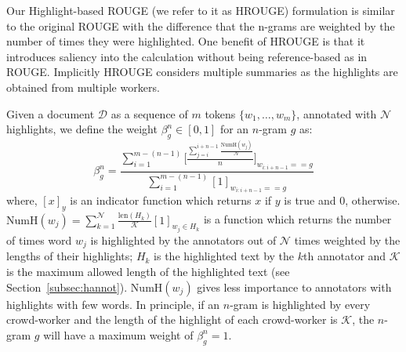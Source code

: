\documentclass[11pt,a4paper]{article}
\newcommand\hrouge{\textsc{HROUGE}}
\newcommand\rouge{\textsc{ROUGE}}
\begin{document}

Our Highlight-based \rouge{} (we refer to it as \hrouge{}) formulation is similar to the original ROUGE with the difference that the n-grams are weighted by the number of times they were highlighted. One benefit of \hrouge{} is that it introduces saliency into the calculation without being reference-based as in \rouge{}. Implicitly \hrouge{} considers multiple summaries as the highlights are obtained from multiple workers. 

Given a document $\mathcal{D}$ as a sequence of $m$ tokens $\{w_1, \ldots, w_m\}$, annotated with $\mathcal{N}$ highlights, we define the weight $\beta_g^n \in [0,1]$ for an $n$-gram $g$ as: 
\begin{equation}
    \beta_g^n = \frac{\displaystyle\sum_{i=1}^{m-(n-1)} \Bigg[\frac{\sum_{j=i}^{i+n-1} \frac{\mathrm{NumH}(w_j)}{\mathcal{N}}}{n}\Bigg]_{w_{i:i+n-1} == g}}{\displaystyle\sum_{i=1}^{m-(n-1)} [1]_{w_{i:i+n-1} == g} }
\end{equation}
\noindent where, $[x]_y$ is an indicator function which returns $x$ if $y$ is true and $0$, otherwise.  $\mathrm{NumH}(w_j) = \sum_{k=1}^{\mathcal{N}} \frac{\mathrm{len}(H_k)}{\mathcal{K}} [1]_{w_j \in H_k}$ is a function which returns the number of times word $w_j$ is highlighted by the annotators out of $\mathcal{N}$ times weighted by the lengths of their highlights; $H_k$ is the highlighted text by the $k$th annotator and  $\mathcal{K}$ is the maximum allowed length of the highlighted text (see Section~\ref{subsec:hannot}). $\mathrm{NumH}(w_j)$ gives less importance to  annotators with highlights with few words. In principle, if an $n$-gram is highlighted by every crowd-worker and the length of the highlight of each crowd-worker is $\mathcal{K}$, the $n$-gram $g$ will have a maximum weight of $\beta_g^n = 1$.
\end{document}

